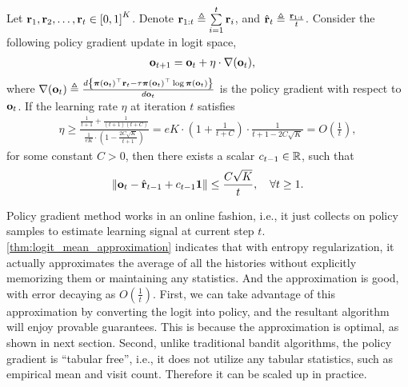 \begin{thm}
\label{thm:logit_mean_approximation}
Let ${\mathbf{r}}_1, {\mathbf{r}}_2, \dots, {\mathbf{r}}_t \in \left[ 0, 1  \right]^K$. Denote ${\mathbf{r}}_{1:t} \triangleq \sum\limits_{i=1}^{t}{{\mathbf{r}}_i}$, and $\hat{{\mathbf{r}}}_t \triangleq \frac{{\mathbf{r}}_{1:t}}{t}$. Consider the following policy gradient update in logit space,
\begin{equation*}
\begin{split}
    {\mathbf{o}}_{t+1} &= {\mathbf{o}}_t + \eta \cdot \nabla({\mathbf{o}}_t),
\end{split}
\end{equation*}
where $\nabla({\mathbf{o}}_t) \triangleq \frac{d \left\{ {\boldsymbol{\pi}}({\mathbf{o}}_t)^\top {\mathbf{r}}_t - \tau {\boldsymbol{\pi}}({\mathbf{o}}_t)^\top \log{{\boldsymbol{\pi}}({\mathbf{o}}_t)} \right\} }{d {\mathbf{o}}_t} $ is the policy gradient with respect to ${\mathbf{o}}_t$. If the learning rate $\eta$ at iteration $t$ satisfies
\begin{equation*}
\begin{split}
    \eta \ge \frac{ \frac{1}{t+1} + \frac{1}{(t+1)(t+C)} }{ \frac{1}{e K} \cdot \left( 1 - \frac{2 C \sqrt{K}}{t+1} \right)  } = e K \cdot \left( 1 + \frac{1}{t+C} \right) \cdot \frac{1}{t+1-2C\sqrt{K}} = O\left( \frac{1}{t} \right),
\end{split}
\end{equation*}
for some constant $C > 0$, then there exists a scalar $c_{t-1} \in {\mathbb{R}}$, such that
\begin{equation*}
    \left\| {\mathbf{o}}_{t} - \hat{{\mathbf{r}}}_{t-1} + c_{t-1} {\mathbf{1}} \right\| \le \frac{C \sqrt{K}}{t}, \quad \forall t \ge 1.
\end{equation*}
\end{thm}

Policy gradient method works in an online fashion, i.e., it just collects on policy samples to estimate learning signal at current step $t$.  \cref{thm:logit_mean_approximation} indicates that with entropy regularization, it actually approximates the average of all the histories without explicitly memorizing them or maintaining any statistics. And the approximation is good, with error decaying as $O\left( \frac{1}{t} \right)$. First, we can take advantage of this approximation by converting the logit into policy, and the resultant algorithm will enjoy provable guarantees. This is because the approximation is optimal, as shown in next section. Second, unlike traditional bandit algorithms, the policy gradient is ``tabular free'', i.e., it does not utilize any tabular statistics, such as empirical mean and visit count. Therefore it can be scaled up in practice.